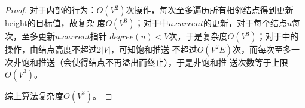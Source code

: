 \begin{proof}
    对于内部的行为：$O(V^2)$次操作，每次至多遍历所有相邻结点得到更新height的目标值，故复杂
    度$O(V^3)$；对于中$u.current$的更新，对于每个结点$u$每次，至多更新$u.current$指针
    $degree(u)<V$次，于是复杂度$O(V^3)$；对于中的操作，由结点高度不超过$2|V|$，可知饱和推送
    不超过$O(V^2E)$次，而每次至多一次非饱和推送（会使得结点不再溢出而终止），于是非饱和推
    送次数等于上限$O(V^3)$。

    综上算法复杂度$O(V^3)$。
\end{proof}